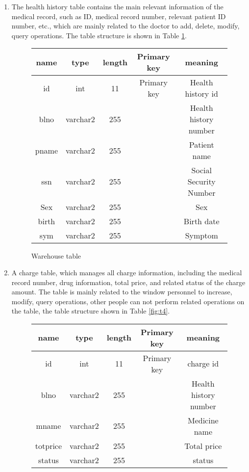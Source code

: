 \begin{enumerate}
\item The health history table contains the main relevant information of the medical record, such as ID, medical record number, relevant patient ID number, etc., which are mainly related to the doctor to add, delete, modify, query operations. The table structure is shown in Table \ref{fig:t3}.
\begin{figure}
    \centering
\begin{tabular}{|c|c|c|c|c|}
\hline
name & type & length & Primary key & meaning \\
\hline
id & int & 11 & Primary key & Health history id\\
\hline
blno & varchar2 & 255 &  & Health history number\\
\hline
pname & varchar2 & 255 &  & Patient name\\
\hline
ssn & varchar2 & 255 &  & Social Security Number\\
\hline
Sex & varchar2 & 255 & & 	Sex\\
\hline
birth & varchar2 & 255 &  & Birth date\\
\hline
sym & varchar2 & 255 &  &	Symptom\\
\hline
\end{tabular}   
\caption{Warehouse table}
    \label{fig:t3}
\end{figure}
\item A charge table, which manages all charge information, including the medical record number, drug information, total price, and related status of the charge amount. The table is mainly related to the window personnel to increase, modify, query operations, other people can not perform related operations on the table, the table structure shown in Table \ref{fig:t4}.
\begin{figure}
    \centering
\begin{tabular}{|c|c|c|c|c|}
\hline
name & type & length & Primary key & meaning \\
\hline
id & int & 11 & Primary key & charge id\\
\hline
blno & varchar2 & 255 &  & Health history number\\
\hline
mname & varchar2 & 255 &  & Medicine name\\
\hline
totprice & varchar2 & 255 &  & Total price\\
\hline
status & varchar2 & 255 & & 	status\\
\hline


\end{tabular}
\end{figure}
\end{enumerate}
